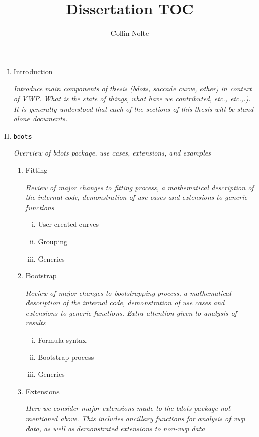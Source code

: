 \documentclass[12pt, letterpaper, twoside]{article}
\begin{document}
\title{\vspace{-3cm}Dissertation TOC}
\author{Collin Nolte}
\date{}
\maketitle

\begin{enumerate}[I.]
\item Introduction

\textit{Introduce main components of thesis (bdots, saccade curve, other) in context of VWP. What is the state of things, what have we contributed, etc., etc.,.). It is generally understood that each of the sections of this thesis will be stand alone documents.}
\item \texttt{bdots}

\textit{Overview of bdots package, use cases, extensions, and examples}
  \begin{enumerate}[1.]
  \item Fitting

\textit{Review of major changes to fitting process, a mathematical description of the internal code, demonstration of use cases and extensions to generic functions}  
  
    \begin{enumerate}[i.]
    \item User-created curves
    \item Grouping
    \item Generics
    \end{enumerate}
  \item Bootstrap

\textit{Review of major changes to bootstrapping process, a mathematical description of the internal code, demonstration of use cases and extensions to generic functions. Extra attention given to analysis of results}    
  
    \begin{enumerate}[i.]
    \item Formula syntax
    \item Bootstrap process
    \item Generics
    \end{enumerate}
  \item Extensions

  \textit{Here we consider major extensions made to the bdots package not mentioned above. This includes ancillary functions for analysis of vwp data, as well as demonstrated extensions to non-vwp data} 
  

\end{enumerate}
\end{enumerate}
\end{document}
